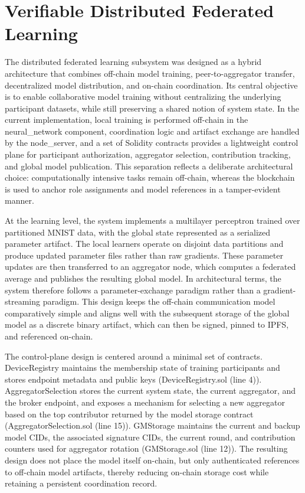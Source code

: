 
\section{Verifiable Distributed Federated Learning}

The distributed federated learning subsystem was designed as a hybrid architecture that combines off-chain model training, peer-to-aggregator transfer, decentralized model distribution, and on-chain coordination. Its central objective is to enable collaborative model training without centralizing the underlying participant datasets, while still preserving a shared notion of system state. In the current implementation, local training is performed off-chain in the neural_network component, coordination logic and artifact exchange are handled by the node_server, and a set of Solidity contracts provides a lightweight control plane for participant authorization, aggregator selection, contribution tracking, and global model publication. This separation reflects a deliberate architectural choice: computationally intensive tasks remain off-chain, whereas the blockchain is used to anchor role assignments and model references in a tamper-evident manner.

At the learning level, the system implements a multilayer perceptron trained over partitioned MNIST data, with the global state represented as a serialized parameter artifact. The local learners operate on disjoint data partitions and produce updated parameter files rather than raw gradients. These parameter updates are then transferred to an aggregator node, which computes a federated average and publishes the resulting global model. In architectural terms, the system therefore follows a parameter-exchange paradigm rather than a gradient-streaming paradigm. This design keeps the off-chain communication model comparatively simple and aligns well with the subsequent storage of the global model as a discrete binary artifact, which can then be signed, pinned to IPFS, and referenced on-chain.

The control-plane design is centered around a minimal set of contracts. DeviceRegistry maintains the membership state of training participants and stores endpoint metadata and public keys (DeviceRegistry.sol (line 4)). AggregatorSelection stores the current system state, the current aggregator, and the broker endpoint, and exposes a mechanism for selecting a new aggregator based on the top contributor returned by the model storage contract (AggregatorSelection.sol (line 15)). GMStorage maintains the current and backup model CIDs, the associated signature CIDs, the current round, and contribution counters used for aggregator rotation (GMStorage.sol (line 12)). The resulting design does not place the model itself on-chain, but only authenticated references to off-chain model artifacts, thereby reducing on-chain storage cost while retaining a persistent coordination record.


